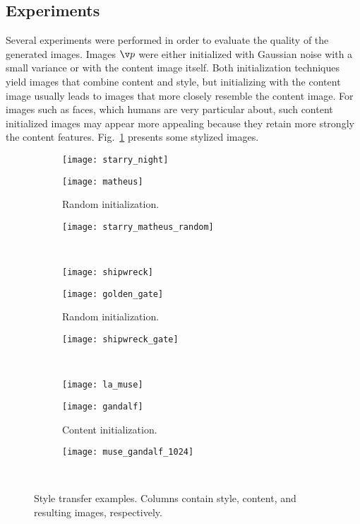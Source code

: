 \subsection{Experiments}
Several experiments were performed in order to evaluate the quality of the generated images. Images $\v p$ were either initialized with Gaussian noise with a small variance or with the content image itself. Both initialization techniques yield images that combine content and style, but initializing with the content image usually leads to images that more closely resemble the content image. For images such as faces, which humans are very particular about, such content initialized images may appear more appealing because they retain more strongly the content features. Fig.~\ref{fig:iterative} presents some stylized images.

\begin{figure}
	\centering
	\begin{subfigure}[t]{0.25\textwidth}
		\vskip 0pt
		\texttt{[image: starry\_night]}
	\end{subfigure}
	\begin{subfigure}[t]{0.35\textwidth}
		\vskip 0pt
		\texttt{[image: matheus]}
		\caption{Random initialization.}
	\end{subfigure}
	\begin{subfigure}[t]{0.35\textwidth}
		\vskip 0pt
		\texttt{[image: starry\_matheus\_random]}
	\end{subfigure}\\
	\begin{subfigure}[t]{0.25\textwidth}
		\vskip 0pt
		\texttt{[image: shipwreck]}
	\end{subfigure}
	\begin{subfigure}[t]{0.35\textwidth}
		\vskip 0pt
		\texttt{[image: golden\_gate]}
		\caption{Random initialization.}
	\end{subfigure}
	\begin{subfigure}[t]{0.35\textwidth}
		\vskip 0pt
		\texttt{[image: shipwreck\_gate]}
	\end{subfigure}\\
	\begin{subfigure}[t]{0.25\textwidth}
		\vskip 0pt
		\texttt{[image: la\_muse]}
	\end{subfigure}
	\begin{subfigure}[t]{0.35\textwidth}
		\vskip 0pt
		\texttt{[image: gandalf]}
		\caption{Content initialization.}
	\end{subfigure}
	\begin{subfigure}[t]{0.35\textwidth}
		\vskip 0pt
		\texttt{[image: muse\_gandalf\_1024]}
	\end{subfigure}\\
	\caption{Style transfer examples. Columns contain style, content, and resulting images, respectively.\label{fig:iterative}}
\end{figure}

